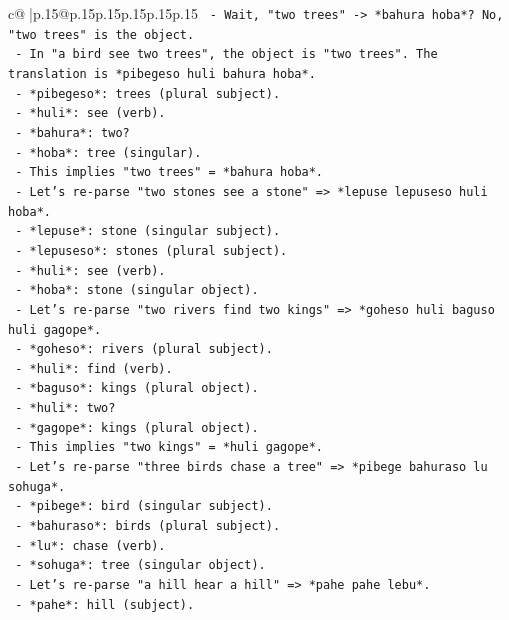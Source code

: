 \documentclass{article}
\begin{document}
{\begin{supertabular}{c@{$\;$}|p{.15\linewidth}@{}p{.15\linewidth}p{.15\linewidth}p{.15\linewidth}p{.15\linewidth}p{.15\linewidth}}
{{{\texttt{      {-} Wait, "two trees" {-}> *bahura hoba*? No, "two trees" is the object.} \\
\texttt{      {-} In "a bird see two trees", the object is "two trees". The translation is *pibegeso huli bahura hoba*.} \\
\texttt{      {-} *pibegeso*: trees (plural subject).} \\
\texttt{      {-} *huli*: see (verb).} \\
\texttt{      {-} *bahura*: two?} \\
\texttt{      {-} *hoba*: tree (singular).} \\
\texttt{      {-} This implies "two trees" = *bahura hoba*.} \\
\texttt{    {-} Let's re{-}parse "two stones see a stone" => *lepuse lepuseso huli hoba*.} \\
\texttt{      {-} *lepuse*: stone (singular subject).} \\
\texttt{      {-} *lepuseso*: stones (plural subject).} \\
\texttt{      {-} *huli*: see (verb).} \\
\texttt{      {-} *hoba*: stone (singular object).} \\
\texttt{    {-} Let's re{-}parse "two rivers find two kings" => *goheso huli baguso huli gagope*.} \\
\texttt{      {-} *goheso*: rivers (plural subject).} \\
\texttt{      {-} *huli*: find (verb).} \\
\texttt{      {-} *baguso*: kings (plural object).} \\
\texttt{      {-} *huli*: two?} \\
\texttt{      {-} *gagope*: kings (plural object).} \\
\texttt{      {-} This implies "two kings" = *huli gagope*.} \\
\texttt{    {-} Let's re{-}parse "three birds chase a tree" => *pibege bahuraso lu sohuga*.} \\
\texttt{      {-} *pibege*: bird (singular subject).} \\
\texttt{      {-} *bahuraso*: birds (plural subject).} \\
\texttt{      {-} *lu*: chase (verb).} \\
\texttt{      {-} *sohuga*: tree (singular object).} \\
\texttt{    {-} Let's re{-}parse "a hill hear a hill" => *pahe pahe lebu*.} \\
\texttt{      {-} *pahe*: hill (subject).} \\
}}}
\end{supertabular}}
\end{document}
